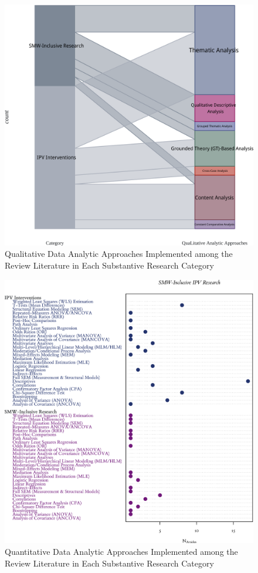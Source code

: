 \documentclass[11pt,]{tufte-book}
\begin{document}
\newpage

\begin{figure}
\centering
\includegraphics{graphics/inputs/aql.png}
\caption{Qualitative Data Analytic Approaches Implemented among the
Review Literature in Each Substantive Research Category\label{fig:aql}}
\end{figure}

\newpage

\begin{figure}
\centering
\includegraphics{graphics/inputs/aqt.png}
\caption{Quantitative Data Analytic Approaches Implemented among the
Review Literature in Each Substantive Research Category\label{fig:aqt}}
\end{figure}
\end{document}
